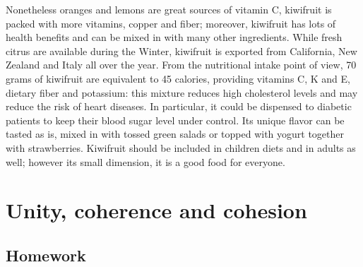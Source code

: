 \documentclass[a4paper,dottedtoc,headinclude,footinclude]{report} %
\theoremstyle{plain}
\begin{document}
    Nonetheless oranges and lemons are great sources of vitamin C,
    kiwifruit is packed with more vitamins, copper and fiber;
    moreover, kiwifruit has lots of health benefits and can be mixed in with
    many other ingredients. While fresh citrus are available during
    the Winter, kiwifruit is exported from California, New Zealand and
    Italy all over the year. From the nutritional intake point of view,
    70 grams of kiwifruit are equivalent to 45 calories,
    providing vitamins C, K and E, dietary fiber and potassium: this
    mixture reduces high cholesterol levels and may reduce the risk of
    heart diseases. In particular, it could be dispensed to diabetic
    patients to keep their blood sugar level under control. Its
    unique flavor can be tasted as is, mixed in with tossed green salads
    or topped with yogurt together with strawberries.  Kiwifruit
    should be included in children diets and in adults as well;
    however its small dimension, it is a good food for everyone.
    
    \chapter{Unity, coherence and cohesion}
    
    \section{Homework}
\end{document}
